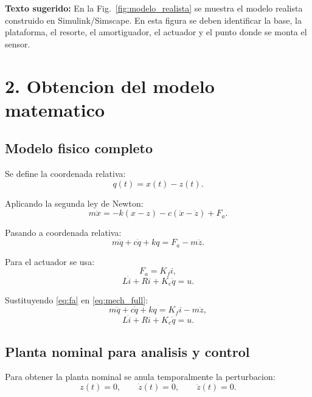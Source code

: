 \documentclass[11pt]{article}
\begin{document}
\noindent\textbf{Texto sugerido:} En la Fig.~\ref{fig:modelo_realista} se muestra el modelo realista construido en Simulink/Simscape. En esta figura se deben identificar la base, la plataforma, el resorte, el amortiguador, el actuador y el punto donde se monta el sensor.

\section{2. Obtencion del modelo matematico}

\subsection{Modelo fisico completo}

Se define la coordenada relativa:
\begin{equation}
q(t)=x(t)-z(t).
\end{equation}

Aplicando la segunda ley de Newton:
\begin{equation}
m\ddot x = -k(x-z)-c(\dot x-\dot z)+F_a.
\end{equation}

Pasando a coordenada relativa:
\begin{equation}
m\ddot q + c\dot q + kq = F_a - m\ddot z.
\label{eq:mech_full}
\end{equation}

Para el actuador se usa:
\begin{equation}
F_a=K_f i,
\label{eq:fa}
\end{equation}
\begin{equation}
L\dot i + Ri + K_e\dot q = u.
\label{eq:elec}
\end{equation}

Sustituyendo \eqref{eq:fa} en \eqref{eq:mech_full}:
\begin{equation}
m\ddot q + c\dot q + kq = K_f i - m\ddot z,
\label{eq:full1}
\end{equation}
\begin{equation}
L\dot i + Ri + K_e\dot q = u.
\label{eq:full2}
\end{equation}

\subsection{Planta nominal para analisis y control}

Para obtener la planta nominal se anula temporalmente la perturbacion:
\[
z(t)=0,\qquad \dot z(t)=0,\qquad \ddot z(t)=0.
\]
\end{document}
